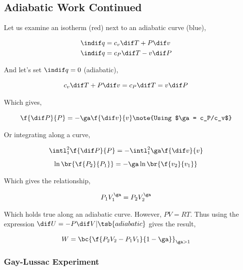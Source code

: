 \documentclass{article}
\begin{document}
\subsection{Adiabatic Work Continued}

Let us examine an isotherm (red) next to an adiabatic curve (blue),

\begin{center}
\end{center}

\begin{align*}
        \indif q &= c_v \dif T + P \dif v \\
        \indif q &= c_P \dif T - v \dif P
\end{align*}

And let's set $\indif q = 0$ (adiabatic),

\[ c_v \dif T + P \dif v = c_P \dif T = v \dif P \]

Which gives,

\[ \f{\dif P}{P} = - \ga \f{\dif v}{v} \note{Using $\ga = c_P/c_v$} \]

Or integrating along a curve,

\[ \intl_1^2 \f{\dif P}{P} = - \intl_1^2 \ga \f{\dif v}{v} \]
\[ \ln\br{\f{P_2}{P_1}} = - \ga \ln\br{\f{v_2}{v_1}} \]

Which gives the relationship,

\[ P_1V_1^\ga = P_2V_2^\ga \]

Which holds true along an adiabatic curve. However, $PV = RT$. Thus using the expression $\dif U = - P \dif V |\tsb{adiabatic}$ gives the result,

\[ W = \bc{\f{P_2V_2 - P_1V_1}{1-\ga}}_{\ga > 1} \]

\subsubsection{Gay-Lussac Experiment}
\label{sec:guylussac}
\end{document}
